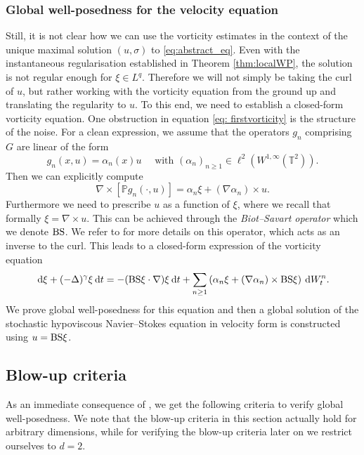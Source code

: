 \documentclass[11pt, a4paper,oneside, reqno]{amsart}
\theoremstyle{remark} %
\theoremstyle{definition} %
\numberwithin{theorem}{section}
\numberwithin{equation}{section}
\renewcommand{\P}{{\mathbb P}}
\newcommand{\BS}{{\rm BS}}
\newcommand{\T}{\mathbb{T}}
\newcommand{\del}{\Delta}
\newcommand{\grad}{\nabla}
\newcommand{\gam}{\gamma}
\newcommand{\dd}{\hspace{2pt}\mathrm{d}}
\begin{document}
\subsubsection{Global well-posedness for the velocity equation}
Still, it is not clear how we can use the vorticity estimates in the context of the unique maximal solution $(u,\sigma)$ to \eqref{eq:abstract_eq}. Even with the instantaneous regularisation established in Theorem \ref{thm:localWP}, the solution is not regular enough for $\xi \in L^q$. Therefore we will not simply be taking the curl of $u$, but rather working with the vorticity equation from the ground up and translating the regularity to $u$. To this end, we need to establish a closed-form vorticity equation. One obstruction in equation \eqref{eq: firstvorticity} is the structure of the noise. For a clean expression, we assume that the operators $g_n$ comprising $G$ are linear of the form
$$g_n(x,u) = \alpha_n(x)u\quad \text{ with }(\alpha_n)_{n\geq 1}\in \ell^2(W^{1,\infty}(\T^2)).$$
Then we can explicitly compute
\begin{equation} \label{explicitly compute}\nabla \times \left[ \P g_n(\cdot,u)\right] = \alpha_n\xi + (\nabla \alpha_n) \times u.\end{equation}
Furthermore we need to prescribe $u$ as a function of $\xi$, where we recall that formally $\xi=\grad \times u$. 
 This can be achieved through the \emph{Biot--Savart operator} which we denote $\BS$. We refer to \cite{bertozzi2002vorticity} for more details on this operator, which acts as an inverse to the curl. This leads to a closed-form expression of the vorticity equation
 \begin{equation*} 
\dd \xi + (-\del)^\gam \xi \dd t  = -(\BS\xi \cdot \grad)\xi \dd t + \sum_{n \geq 1} \left(\alpha_n\xi + (\nabla \alpha_n) \times \BS\xi\right)\dd W^n_t.\end{equation*}
We prove global well-posedness for this
equation and then a global solution of the stochastic hypoviscous Navier--Stokes equation in velocity form is constructed using $u=\BS \xi$.



\subsection{Blow-up criteria}\label{subsec:blowupcrit}

As an immediate consequence of \cite[Theorems 5.1 \& 5.2]{AV25_survey}, we get the following criteria to verify global well-posedness. We note that the blow-up criteria in this section actually hold for arbitrary dimensions, while for verifying the blow-up criteria later on we restrict ourselves to $d=2$.
\end{document}
